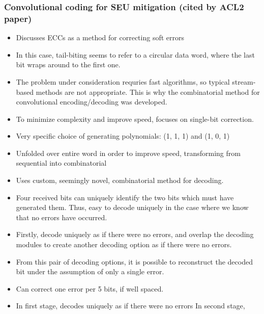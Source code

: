 \documentclass{article}
\begin{document}
\subsubsection{Convolutional coding for SEU mitigation (cited by ACL2 paper)}

\begin{itemize}
\item Discusses ECCs as a method for correcting soft errors

\item In this case, tail-biting seems to refer to a circular data word, where
the last bit wraps around to the first one.

\item The problem under consideration requries fast algorithms, so typical
stream-based methods are not appropriate. This is why the combinatorial
method for convolutional encoding/decoding was developed.

\item To minimize complexity and improve speed, focuses on single-bit
correction.

\item Very specific choice of generating polynomials: (1, 1, 1) and (1, 0, 1)

\item Unfolded over entire word in order to improve speed, transforming from
sequential into combinatorial

\item Uses custom, seemingly novel, combinatorial method for decoding.

\item Four received bits can uniquely identify the two bits which must have
generated them. Thus, easy to decode uniquely in the case where we know
that no errors have occurred.

\item Firstly, decode uniquely as if there were no errors, and overlap the
decoding modules to create another decoding option as if there were no
errors.

\item From this pair of decoding options, it is possible to reconstruct the
decoded bit under the assumption of only a single error.

\item Can correct one error per 5 bits, if well spaced.

\item In first stage, decodes uniquely as if there were no errors
In second stage,
\end{itemize}
\end{document}
